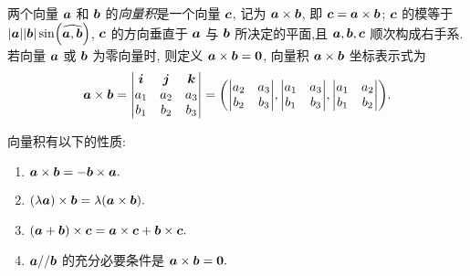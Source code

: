 \begin{definition}
    两个向量 $ \vb*{a} $ 和 $ \vb*{b} $ 的\textit{向量积}是一个向量 $ \vb*{c} $, 记为 $ \vb*{a} \times \vb*{b} $,
    即 $ \vb*{c}=\vb*{a} \times \vb*{b}$; $\vb*{c} $ 的模等于 $ |\vb*{a}||\vb*{b}| \sin (\widehat{\vb*{a}, \vb*{b}})$, $\vb*{c} $ 的方向垂直于 $ \vb*{a} $ 与 $ \vb*{b} $ 所决定的平面,且 $ \vb*{a}, \vb*{b}, \vb*{c} $ 顺次构成右手系.
    若向量 $ \vb*{a} $ 或 $ \vb*{b} $ 为零向量时, 则定义 $ \vb*{a} \times \vb*{b}=\mathbf{0} $, 向量积 $ \vb*{a} \times \vb*{b} $ 坐标表示式为
    $$
        \vb*{a} \times \vb*{b}=\mqty|\vb*{i} & \vb*{j} & \vb*{k} \\
        a_{1}   & a_{2}   & a_{3}   \\
        b_{1}   & b_{2}   & b_{3}|=\qty(
        \mqty|a_{2} & a_{3} \\
        b_{2} & b_{3}|,\mqty|a_{1} & a_{3} \\
        b_{1} & b_{3}|,\mqty|a_{1} & a_{2} \\
        b_{1} & b_{2}|
        ).
    $$
\end{definition}

向量积有以下的性质:
\begin{enumerate}[label=(\arabic{*})]
    \item $\vb*{a} \times \vb*{b}=-\vb*{b} \times \vb*{a} .$
    \item $(\lambda \vb*{a}) \times \vb*{b}=\lambda(\vb*{a} \times \vb*{b}) .$
    \item $(\vb*{a}+\vb*{b}) \times \vb*{c}=\vb*{a} \times \vb*{c}+\vb*{b} \times \vb*{c} .$
    \item $\vb*{a} / / \vb*{b} $ 的充分必要条件是 $ \vb*{a} \times \vb*{b}=\mathbf{0} .$
\end{enumerate}


